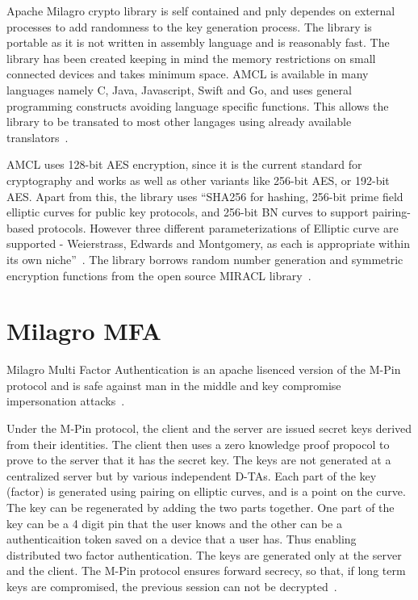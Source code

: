 Apache Milagro crypto library is self contained and pnly dependes on
external processes to add randomness to the key generation
process. The library is portable as it is not written in assembly
language and is reasonably fast. The library has been created keeping
in mind the memory restrictions on small connected devices and takes
minimum space. AMCL is available in many languages namely C, Java,
Javascript, Swift and Go, and uses general programming constructs
avoiding language specific functions. This allows the library to be
transated to most other langages using already available
translators~\cite{mcl-white-paper}.

AMCL uses 128-bit AES encryption, since it is the current standard for
cryptography and works as well as other variants like 256-bit AES, or
192-bit AES\@. Apart from this, the library uses ``SHA256 for hashing,
256-bit prime field elliptic curves for public key protocols, and
256-bit BN curves to support pairing-based protocols. However three
different parameterizations of Elliptic curve are supported -
Weierstrass, Edwards and Montgomery, as each is appropriate within its
own niche''~\cite{mcl-white-paper}. The library borrows random number
generation and symmetric encryption functions from the open source
MIRACL library~\cite{mcl-white-paper}.


\section{Milagro MFA}

Milagro Multi Factor Authentication is an apache lisenced version of
the M-Pin protocol and is safe against man in the middle and key
compromise impersonation attacks~\cite{milagro-mfa}.

Under the M-Pin protocol, the client and the server are issued secret
keys derived from their identities. The client then uses a zero
knowledge proof propocol to prove to the server that it has the secret
key. The keys are not generated at a centralized server but by various
independent D-TAs. Each part of the key (factor) is generated using
pairing on elliptic curves, and is a point on the curve. The key can
be regenerated by adding the two parts together. One part of the key
can be a 4 digit pin that the user knows and the other can be a
authenticaition token saved on a device that a user has. Thus enabling
distributed two factor authentication. The keys are generated only at
the server and the client. The M-Pin protocol ensures forward secrecy,
so that, if long term keys are compromised, the previous session can
not be decrypted~\cite{milagro-protocols}.


